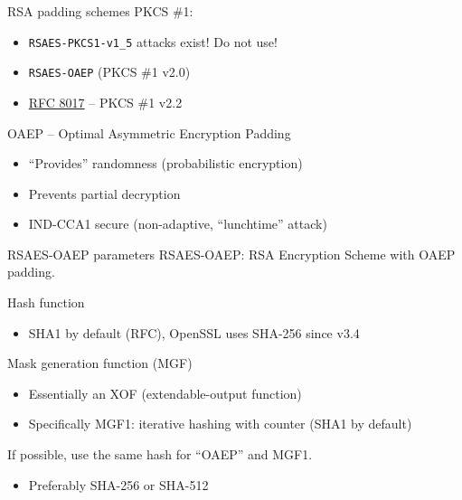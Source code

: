\begin{frame}{RSA padding schemes}
  \pause
  PKCS \#1:
  \begin{itemize}[<+(1)->]
    \item \texttt{RSAES-PKCS1-v1\_5} attacks exist!
    Do not use!
    \item \texttt{RSAES-OAEP} (PKCS \#1 v2.0)
    \item \href{https://datatracker.ietf.org/doc/html/rfc8017}{RFC 8017} -- PKCS \#1 v2.2
  \end{itemize}

  \vspace*{1em}

  \pause
  OAEP -- Optimal Asymmetric Encryption Padding
  \begin{itemize}[<+(1)->]
    \item \enquote{Provides} randomness (probabilistic encryption)
    \item Prevents partial decryption
    \item IND-CCA1 secure (non-adaptive, \enquote{lunchtime} attack)
  \end{itemize}
\end{frame}

\begin{frame}{RSAES-OAEP parameters}
  RSAES-OAEP: RSA Encryption Scheme with OAEP padding.

  \vspace*{0.5em}

  \pause
  Hash function
  \begin{itemize}
    \item SHA1 by default (RFC), OpenSSL uses SHA-256 since v3.4
  \end{itemize}

  \vspace*{0.5em}

  \pause 
  Mask generation function (MGF)
  \pause
  \begin{itemize}
    \item Essentially an XOF (extendable-output function)
    \item Specifically MGF1: iterative hashing with counter (SHA1 by default)
  \end{itemize}

  \vspace*{0.5em}

  \pause
  If possible, use the same hash for \enquote{OAEP} and MGF1.
  \begin{itemize}
    \item Preferably SHA-256 or SHA-512
  \end{itemize}
\end{frame}

